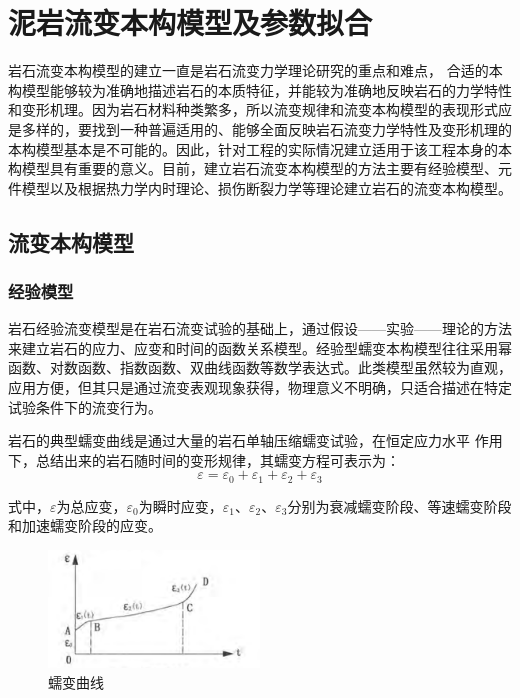 \chapter{泥岩流变本构模型及参数拟合}

\label{chap:theory}
岩石流变本构模型的建立一直是岩石流变力学理论研究的重点和难点，
合适的本构模型能够较为准确地描述岩石的本质特征，并能较为准确地反映岩石的力学特性和变形机理。因为岩石材料种类繁多，所以流变规律和流变本构模型的表现形式应是多样的，要找到一种普遍适用的、能够全面反映岩石流变力学特性及变形机理的本构模型基本是不可能的。因此，针对工程的实际情况建立适用于该工程本身的本构模型具有重要的意义。目前，建立岩石流变本构模型的方法主要有经验模型、元件模型以及根据热力学内时理论、损伤断裂力学等理论建立岩石的流变本构模型。

\section{流变本构模型}

\subsection{经验模型}
岩石经验流变模型是在岩石流变试验的基础上，通过假设——实验——理论的方法来建立岩石的应力、应变和时间的函数关系模型。经验型蠕变本构模型往往采用幂函数、对数函数、指数函数、双曲线函数等数学表达式。此类模型虽然较为直观，应用方便，但其只是通过流变表观现象获得，物理意义不明确，只适合描述在特定试验条件下的流变行为。

岩石的典型蠕变曲线是通过大量的岩石单轴压缩蠕变试验，在恒定应力水平 作用下，总结出来的岩石随时间的变形规律，其蠕变方程可表示为：
\begin{equation}
     {\varepsilon}={\varepsilon}_{0}+{\varepsilon}_{1}+{\varepsilon}_{2}+{\varepsilon}_{3}
\end{equation}

式中，$\varepsilon$为总应变，$\varepsilon_0$为瞬时应变，$\varepsilon_1$、$\varepsilon_2$、$\varepsilon_3$分别为衰减蠕变阶段、等速蠕变阶段和加速蠕变阶段的应变。

\begin{figure}[ht!]
    \centering
            \centering
            \includegraphics[width=0.5\textwidth]{img/chap3/蠕变曲线.png}
    \caption{蠕变曲线}
    \label{fig:3-1}

\end{figure}


